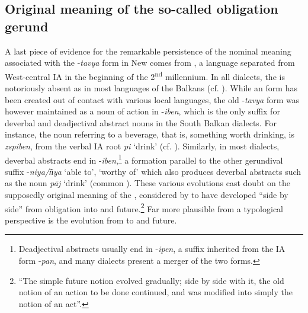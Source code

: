 \documentclass[output=paper]{langsci/langscibook}
\begin{document}
\subsection{Original meaning of the so-called obligation gerund}\label{sec:montaut:4.4}

A last piece of evidence for the remarkable persistence of the nominal meaning associated with the -\textit{tavya} form in New  comes from , a language separated from West-central IA in the beginning of the 2\textsuperscript{nd} millennium. In all  dialects, the  is notoriously absent as in most languages of the Balkans (cf. \citealt{Boretzky1996}). While an  form has been created out of contact with various local languages, the old -\textit{tavya} form was however maintained as a noun of action in -\textit{iben}, which is the only suffix for deverbal and deadjectival abstract nouns in the South Balkan dialects. For instance, the noun referring to a beverage, that is, something worth drinking, is \textit{zspiben}, from the verbal IA root \textit{pi} ‘drink’ (cf. \citealt{Beniśek2010}). Similarly, in most  dialects, deverbal abstracts end in -\textit{iben},\footnote{Deadjectival abstracts usually end in -\textit{ipen}, a suffix inherited from the IA form -\textit{pan}, and many dialects present a merger of the two forms.} a formation parallel to the other gerundival suffix -\textit{niya/n͂ya} ‘able to’, ‘worthy of’ which also produces deverbal abstracts such as the noun \textit{pāj} ‘drink’ (common ).
These various evolutions cast doubt on the supposedly original meaning of the , considered by \citet[966]{Chatterji1926} to have developed “side by side” from obligation into  and future.\footnote{“The simple future notion evolved gradually; side by side with it, the old notion of an action to be done continued, and was modified into simply the notion of an act”.} Far more plausible from a typological perspective is the evolution from  to  and future.
\end{document}
